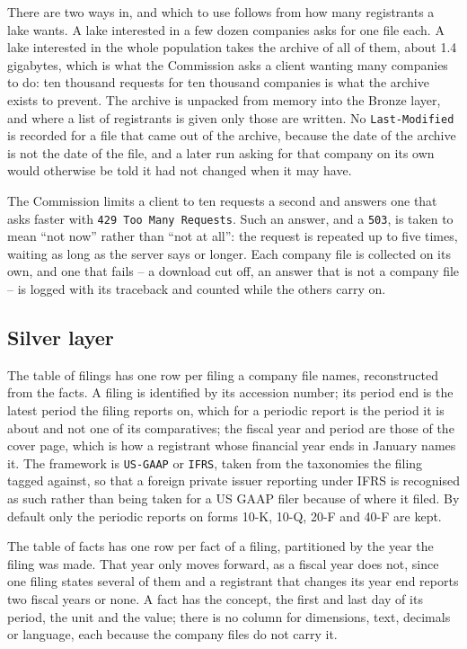 There are two ways in, and which to use follows from how many registrants a lake wants. A lake interested in a few dozen companies asks for one file each. A lake interested in the whole population takes the archive of all of them, about 1.4 gigabytes, which is what the Commission asks a client wanting many companies to do: ten thousand requests for ten thousand companies is what the archive exists to prevent. The archive is unpacked from memory into the Bronze layer, and where a list of registrants is given only those are written. No \verb|Last-Modified| is recorded for a file that came out of the archive, because the date of the archive is not the date of the file, and a later run asking for that company on its own would otherwise be told it had not changed when it may have.

The Commission limits a client to ten requests a second and answers one that asks faster with \verb|429 Too Many Requests|. Such an answer, and a \verb|503|, is taken to mean ``not now'' rather than ``not at all'': the request is repeated up to five times, waiting as long as the server says or longer. Each company file is collected on its own, and one that fails -- a download cut off, an answer that is not a company file -- is logged with its traceback and counted while the others carry on.

\subsection{Silver layer}

The table of filings has one row per filing a company file names, reconstructed from the facts. A filing is identified by its accession number; its period end is the latest period the filing reports on, which for a periodic report is the period it is about and not one of its comparatives; the fiscal year and period are those of the cover page, which is how a registrant whose financial year ends in January names it. The framework is \verb|US-GAAP| or \verb|IFRS|, taken from the taxonomies the filing tagged against, so that a foreign private issuer reporting under IFRS is recognised as such rather than being taken for a US GAAP filer because of where it filed. By default only the periodic reports on forms 10-K, 10-Q, 20-F and 40-F are kept.

The table of facts has one row per fact of a filing, partitioned by the year the filing was made. That year only moves forward, as a fiscal year does not, since one filing states several of them and a registrant that changes its year end reports two fiscal years or none. A fact has the concept, the first and last day of its period, the unit and the value; there is no column for dimensions, text, decimals or language, each because the company files do not carry it.

